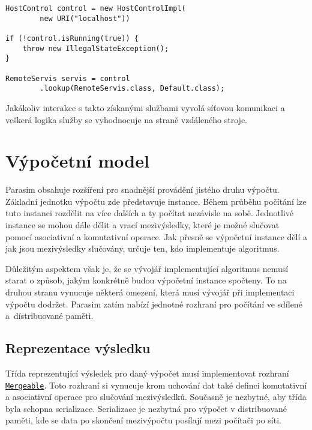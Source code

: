 \begin{lstlisting}[label={code:host:control}, caption={Přístup ke vzdálenému serveru}, style=Java]
HostControl control = new HostControlImpl(
		new URI("localhost"))

if (!control.isRunning(true)) {
	throw new IllegalStateException();
}

RemoteServis servis = control
		.lookup(RemoteServis.class, Default.class);
\end{lstlisting}

Jakákoliv interakce s takto získanými službami vyvolá síťovou komunikaci a veškerá logika
služby se vyhodnocuje na straně vzdáleného stroje.

\section{Výpočetní model}

Parasim obsahuje rozšíření pro snadnější provádění jistého druhu vý\-poč\-tu.
Základní jednotku výpočtu zde představuje instance. Během průběhu po\-čí\-tá\-ní lze
tuto instanci rozdělit na více dalších a ty počítat nezávisle na sobě. Jednotlivé instance
se mohou dále dělit a vrací mezivýsledky, které je možné slučovat pomocí asociativní
a komutativní operace. Jak přesně se výpočetní instance dělí a jak jsou mezivýsledky
slučovány, určuje ten, kdo implementuje algoritmus.

Důležitým aspektem však je, že se vývojář implementující algoritmus nemusí starat
o způsob, jakým konkrétně budou výpočetní instance spoč\-te\-ny. To na druhou stranu vynucuje
některá omezení, která musí vývojář při implementaci výpočtu dodržet.  Parasim zatím nabízí
jednotné rozhraní pro počítání ve sdílené a~dís\-tri\-buo\-va\-né paměti.

\subsection{Reprezentace výsledku}

Třída reprezentující výsledek pro daný výpočet musí implementovat rozhraní \href{https://github.com/sybila/parasim/blob/2.0.0.Final/model/core/src/main/java/org/sybila/parasim/model/Mergeable.java}{\texttt{Mergeable}}. Toto rozhraní si vynucuje krom uchování dat také definci komutativní
a asociativní operace pro slučování mezivýsledků. Sou\-čas\-ně je nezbytné, aby třída
byla schopna serializace. Serializace je nezbytná pro výpočet v dis\-tri\-buo\-va\-né paměti,
kde se data po skončení mezivýpočtu po\-sí\-la\-jí mezi počítači po síti.

